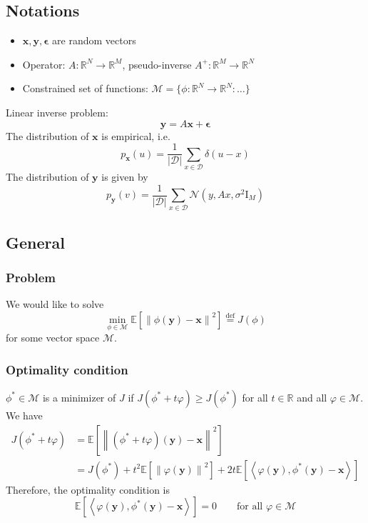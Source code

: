 \documentclass[a4paper,10pt]{article}
\theoremstyle{definition} %
\theoremstyle{definition} %
\theoremstyle{definition} %
\theoremstyle{definition} %
\newcommand{\R}{\mathbb{R}}
\newcommand{\E}[1]{\mathbb{E} \left[ {#1} \right] }
\newcommand{\Normal}[1]{\mathcal{N}\left( {#1} \right)}
\newcommand{\Id}{\mathrm{I}}
\newcommand{\norm}[1]{\left\| #1 \right \|}
\newcommand{\inner}[1]{\left\langle #1 \right\rangle}
\newcommand{\M}{\mathcal{M}}
\newcommand{\x}{\boldsymbol{x}}
\newcommand{\beps}{\boldsymbol{\epsilon}}
\newcommand{\y}{\boldsymbol{y}}
\newcommand{\0}{\boldsymbol{0}}
\newcommand{\D}{\mathcal{D}}
\newcommand{\eqdef}{\stackrel{\mathrm{def}}{=}}
\begin{document}
\subsection{Notations}
\begin{itemize}
    \item[]  $\x, \y, \beps$ are random vectors 
    \item[] Operator: $A: \R^N \to \R^M$, pseudo-inverse $A^+ : \R^M \to \R^N$
    \item[] Constrained set of functions: $\M = \{ \phi : \R^N \to \R^N: \dots \}$
\end{itemize}
Linear inverse problem:
\begin{equation*}
   \y = A \x + \beps 
\end{equation*}
The distribution of $\x$ is empirical, i.e.
\begin{equation}
    p_{\x}(u) =  \frac{1}{|\D|}\sum_{x\in\D} \delta(u-x)
\end{equation}
The distribution of $\y$ is given by
\begin{equation*}
    p_{\y}(v) = \frac{1}{|\D|}\sum_{x\in\D} \Normal{y,Ax,\sigma^2\Id_M}
\end{equation*}

\subsection{General}
\subsubsection{Problem}
We would like to solve
\begin{equation}\label{eq:general_problem}
    \min_{\phi \in \M} \E{\norm{\phi(\y) - \x}^2} \eqdef J(\phi)
\end{equation}
for some vector space $\M$. 
\subsubsection{Optimality condition}
$\phi^* \in \M$ is a minimizer of $J$ if $J(\phi^* + t \varphi) \geqslant J(\phi^*)$ for all $t \in \R$ and all $\varphi \in \M$. We have 
\begin{align*}
    J(\phi^* + t \varphi) &= \E{\norm{(\phi^* + t \varphi) (\y) - \x}^2} \\
    &= J(\phi^*) + t^2 \E{\norm{\varphi(\y)}^2} + 2t \E{\inner{\varphi(\y), \phi^*(\y) - \x}} 
\end{align*}
Therefore, the optimality condition is 
\begin{equation}\label{eq:optimality_condition}
    \E{\inner{\varphi(\y), \phi^*(\y) - \x}} = 0 \qquad \mbox{for all } \varphi \in \M
\end{equation}
\end{document}
